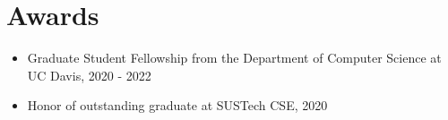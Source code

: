 \documentclass[letterpaper,11pt]{article}
\makeatletter
\newcommand{\resumeSubheading}[6]{
  \vspace{-1pt}\item
    \begin{tabular*}{0.97\textwidth}[t]{l@{\extracolsep{\fill}}r}
      \textbf{#1} & #2 \\
      #3 & #4 \\
      \textbf{#5} & \textbf{#6} \\
    \end{tabular*}\vspace{-5pt}
}
\newcommand{\resumeSubHeadingListStart}{\begin{itemize}[leftmargin=*]}
\newcommand{\resumeSubHeadingListEnd}{\end{itemize}}
\makeatother
\begin{document}

\section{Awards}
  \resumeSubHeadingListStart

    \item {Graduate Student Fellowship from the Department of Computer Science at UC Davis, 2020 - 2022 }
   
    \item {Honor of outstanding graduate at SUSTech CSE, 2020 }
   
   
 \resumeSubHeadingListEnd




      
          

          
\end{document}
